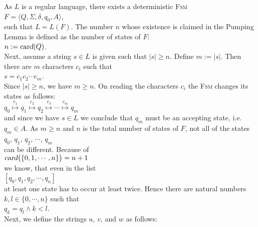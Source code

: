 \proofEng
As $L$ is a regular language, there exists a deterministic \textsc{Fsm}
\\[0.2cm]
\hspace*{1.3cm}
$F = \langle Q, \Sigma, \delta, q_0, A \rangle$,
\\[0.2cm]
such that $L = L(F)$.  The number $n$ whose existence is claimed in the Pumping Lemma is defined as
the number of states of $F$: 
\\[0.2cm]
\hspace*{1.3cm}
$n := \textsl{card}(Q)$.
\\[0.2cm]
Next, assume a string $s \in L$ is given such that $|s| \geq n$.  Define $m := |s|$. Then there are $m$
characters $c_i$ such that
\\[0.2cm]
\hspace*{1.3cm}
$s = c_1 c_2 \cdots c_m$.
\\[0.2cm]
Since $|s| \geq n$, we have $m \geq n$.  On reading the characters $c_i$ the \textsc{Fsm} changes its
states as follows:
\\[0.2cm]
\hspace*{1.3cm}
$q_0 \stackrel{c_1}{\longmapsto} q_1 \stackrel{c_2}{\longmapsto} q_2 \stackrel{c_3}{\longmapsto} \cdots \stackrel{c_m}{\longmapsto} q_m$
\\[0.2cm]
and since we have  $s \in L$ we conclude that  $q_m$ must be an accepting state, i.e.~$q_m \in A$.
As $m \geq n$ and $n$ is the total number of states of $F$, not all of the states 
\\[0.2cm]
\hspace*{1.3cm}
$q_0$, $q_1$, $q_2$, $\cdots$, $q_m$
\\[0.2cm]
can be different.
Because of
\\[0.2cm]
\hspace*{1.3cm}
$\textsl{card}\bigl(\{0,1,\cdots,n\}\bigr) = n+1$
\\[0.2cm]
we know, that even in the list
\\[0.2cm]
\hspace*{1.3cm}
$[q_0,q_1,q_2,\cdots, q_{n}]$
\\[0.2cm]
at least one state has to occur at least twice.  Hence there are natural numbers $k, l \in \{0,\cdots,n\}$ such that
\\[0.2cm]
\hspace*{1.3cm}
$q_k = q_l \wedge k < l$.
\\[0.2cm]
Next, we define the strings $u$, $v$, and $w$ as follows:
\\[0.2cm]
\hspace*{1.3cm}
